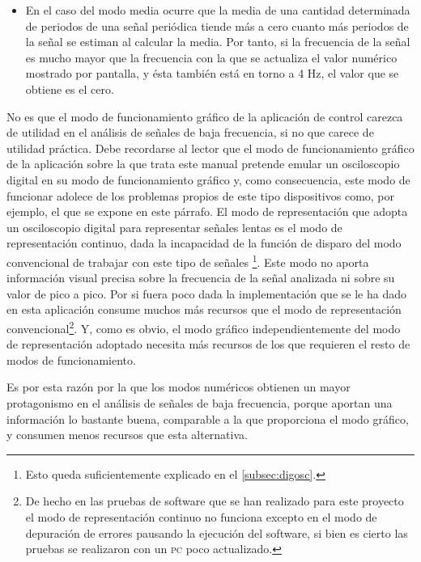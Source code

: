 \begin{itemize}
	\item En el caso del modo media ocurre que la media de una cantidad
		determinada de periodos de una señal periódica tiende más a
		cero cuanto más periodos de la señal se estiman al calcular
		la media. Por tanto, si la frecuencia de la señal es mucho
		mayor que la frecuencia con la que se actualiza el valor
		numérico mostrado por pantalla, y ésta también está en
		torno a 4 Hz, el valor que se obtiene es el cero.
\end{itemize}

No es que el modo de funcionamiento gráfico de la aplicación de control
carezca de utilidad en el análisis de señales de baja frecuencia, si no que
carece de utilidad práctica. Debe recordarse al lector que el modo de
funcionamiento gráfico de la aplicación sobre la que trata este manual
pretende emular un osciloscopio digital en su modo de funcionamiento
gráfico y, como consecuencia, este modo de funcionar adolece de los
problemas propios de este tipo dispositivos como, por ejemplo, el que se
expone en este párrafo. El modo de representación que adopta un
osciloscopio digital para representar señales lentas es el modo de
representación continuo, dada la incapacidad de la función de disparo del
modo convencional de trabajar con este tipo de señales \footnote{Esto queda
suficientemente explicado en el \vref{subsec:digosc}.}. Este modo no aporta
información visual precisa sobre la frecuencia de la señal analizada ni
sobre su valor de pico a pico. Por si fuera poco dada la implementación que
se le ha dado en esta aplicación consume muchos más recursos que el modo de
representación convencional\footnote{De hecho en las pruebas de software
que se han realizado para este proyecto el modo de representación continuo
no funciona excepto en el modo de depuración de errores pausando la
ejecución del software, si bien es cierto las pruebas se realizaron con un
\textsc{pc} poco actualizado.}. Y, como es obvio, el modo gráfico
independientemente del modo de representación adoptado necesita más
recursos de los que requieren el resto de modos de funcionamiento.

Es por esta razón por la que los modos numéricos obtienen un mayor
protagonismo en el análisis de señales de baja frecuencia, porque aportan
una información lo bastante buena, comparable a la que proporciona el modo
gráfico, y consumen menos recursos que esta alternativa.
